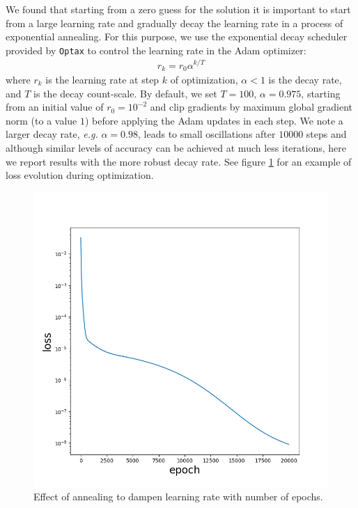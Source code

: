 \documentclass{elsarticle}
\begin{document}
We found that starting from a zero guess for the solution it is important to start from a large learning rate and gradually decay the learning rate in a process of exponential annealing. For this purpose, we use the exponential decay scheduler provided by \texttt{Optax} \cite{optax2020github} to control the learning rate in the Adam \cite{kingma2014adam} optimizer:
\begin{align*}
r_{k} = r_0 \alpha^{k / T}
\end{align*}
where $r_k$ is the learning rate at step $k$ of optimization, $\alpha<1$ is the decay rate, and $T$ is the decay count-scale. By default, we set $T=100$, $\alpha=0.975$, starting from an initial value of $r_0=10^{-2}$ and clip gradients by maximum global gradient norm (to a value $1$) \cite{gradClipping} before applying the Adam updates in each step. We note a larger decay rate, \textit{e.g.} $\alpha=0.98$, leads to small oscillations after $10000$ steps and although similar levels of accuracy can be achieved at much less iterations, here we report results with the more robust decay rate. See figure \ref{fig::optimization} for an example of loss evolution during optimization.

\begin{figure}[ht]
\centering
\includegraphics[width=0.85\linewidth]{figures/poisson_solver_loss_with_annealing.png}
\caption{Effect of annealing to dampen learning rate with number of epochs. }
\label{fig::optimization}
\end{figure}
\end{document}
